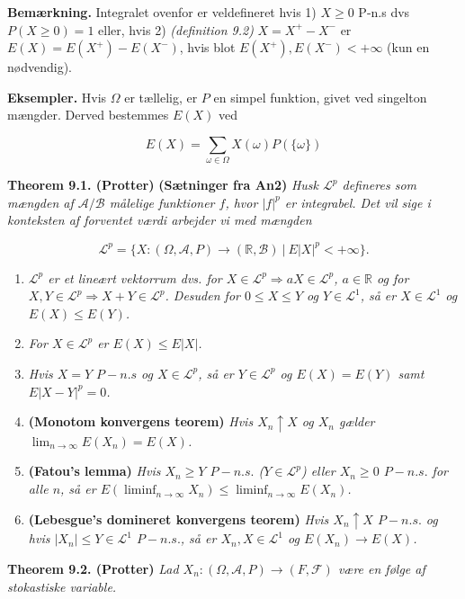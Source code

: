 \documentclass[a4paper,10pt,openany]{book}
\providecommand{\tightlist}{%
 \setlength{\itemsep}{0pt}\setlength{\parskip}{0pt}}
\begin{document}
\textbf{Bemærkning.} Integralet ovenfor er veldefineret hvis 1) \(X\ge 0\) P-n.s dvs \(P(X\ge 0)=1\) eller, hvis 2) \emph{(definition 9.2)} \(X=X^+-X^-\) er \(E(X)=E(X^+)-E(X^-)\), hvis blot \(E(X^+),E(X^-)<+\infty\) (kun en nødvendig).

\textbf{Eksempler.} Hvis \(\Omega\) er tællelig, er \(P\) en simpel funktion, givet ved singelton mængder. Derved bestemmes \(E(X)\) ved

\[
E(X)=\sum_{\omega\in\Omega} X(\omega)P(\{\omega\})
\]

\textbf{Theorem 9.1. (Protter)} \textbf{(Sætninger fra An2)} \emph{Husk \(\mathcal{L}^p\) defineres som mængden af \(\mathcal{A}/\mathcal{B}\) målelige funktioner \(f\), hvor \(\vert f\vert ^p\) er integrabel. Det vil sige i konteksten af forventet værdi arbejder vi med mængden}

\[
\mathcal{L}^p=\{X : (\Omega,\mathcal{A},P)\to(\mathbb{R},\mathcal{B})\ \vert\ E\vert X\vert^p< +\infty\}.
\]

\begin{enumerate}
\def\labelenumi{\alph{enumi}.}
\tightlist
\item
  \emph{\(\mathcal{L}^p\) er et lineært vektorrum dvs. for \(X\in \mathcal{L}^p\Rightarrow aX\in\mathcal{L}^p\), \(a\in\mathbb{R}\) og for \(X,Y\in\mathcal{L}^p\Rightarrow X+Y\in\mathcal{L}^p\). Desuden for \(0\le X\le Y\) og \(Y\in\mathcal{L}^1\), så er \(X\in\mathcal{L}^1\) og \(E(X)\le E(Y)\).}
\item
  \emph{For \(X\in\mathcal{L}^p\) er \(E(X)\le E\vert X\vert\).}
\item
  \emph{Hvis \(X=Y\) \(P-n.s\) og \(X\in\mathcal{L}^p\), så er \(Y\in\mathcal{L}^p\) og \(E(X)=E(Y)\) samt \(E\vert X-Y\vert^p=0\).}
\item
  \textbf{(Monotom konvergens teorem)} \emph{Hvis \(X_n\uparrow X\) og \(X_n\) gælder \(\lim_{n\to \infty} E(X_n)=E(X)\).}
\item
  \textbf{(Fatou's lemma)} \emph{Hvis \(X_n\ge Y\) \(P-n.s.\) (\(Y\in\mathcal{L}^p\)) eller \(X_n\ge 0\) \(P-n.s.\) for alle \(n\), så er \(E(\liminf_{n\to\infty}X_n)\le \liminf_{n\to \infty} E(X_n)\).}
\item
  \textbf{(Lebesgue's domineret konvergens teorem)} \emph{Hvis \(X_n\uparrow X\) \(P-n.s.\) og hvis \(\vert X_n\vert \le Y\in\mathcal{L}^1\) \(P-n.s.\), så er \(X_n,X\in\mathcal{L}^1\) og \(E(X_n)\to E(X)\).}
\end{enumerate}

\textbf{Theorem 9.2. (Protter)} \emph{Lad \(X_n : (\Omega,\mathcal{A},P)\to(F,\mathcal{F})\) være en følge af stokastiske variable.}
\end{document}
